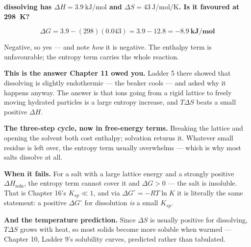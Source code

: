 \documentclass{apchem-worksheet}
\begin{document}
\begin{workedexample}
\textbf{ dissolving has $\Delta H =
\SI{+3.9}{\kilo\joule\per\mole}$ and $\Delta S =
\SI{+43}{\joule\per\mole\per\kelvin}$. Is it favoured at
\SI{298}{\kelvin}?}

\[ \Delta G = 3.9 - (298)(0.043)
   = 3.9 - 12.8 = \mathbf{\SI{-8.9}{\kilo\joule\per\mole}} \]

Negative, so yes --- and note \emph{how} it is negative. The enthalpy
term is unfavourable; the entropy term carries the whole reaction.

\textbf{This is the answer Chapter 11 owed you.} Ladder 5 there showed
that dissolving  is slightly endothermic --- the beaker cools
--- and asked why it happens anyway. The answer is that ions going from
a rigid lattice to freely moving hydrated particles is a large entropy
increase, and $T\Delta S$ beats a small positive $\Delta H$.

\textbf{The three-step cycle, now in free-energy terms.} Breaking the
lattice and opening the solvent both cost enthalpy; solvation returns
it. Whatever small residue is left over, the entropy term usually
overwhelms --- which is why most salts dissolve at all.

\textbf{When it fails.} For a salt with a large lattice energy and a
strongly positive $\Delta H_{\text{soln}}$, the entropy term cannot
cover it and $\Delta G > 0$ --- the salt is insoluble. That is
Chapter 16's $K_{sp} \ll 1$, and via $\Delta G^{\circ} = -RT\ln K$
it is literally the same statement: a positive $\Delta G^{\circ}$ for
dissolution \emph{is} a small $K_{sp}$.

\textbf{And the temperature prediction.} Since $\Delta S$ is usually
positive for dissolving, $T\Delta S$ grows with heat, so most solids
become more soluble when warmed --- Chapter 10, Ladder 9's solubility
curves, predicted rather than tabulated.
\end{workedexample}
\end{document}
